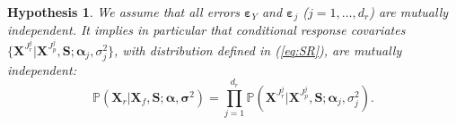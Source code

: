 \documentclass[12pt,a4paper]{report}
\newtheorem{hyp}{Hypothesis}
\begin{document}
\begin{hyp}\label{H3}
We assume that all errors $\boldsymbol{\varepsilon}_Y$ and $\boldsymbol{\varepsilon}_j$ ($j=1,\ldots,d_r$) are {\it mutually independent}. It implies in particular that conditional response covariates $\{\boldsymbol{X}^{J_{r}^j}|\boldsymbol{X}^{J_{p}^j},\boldsymbol{S};\boldsymbol{\alpha}_j,\sigma^2_j\}$, with distribution defined in (\ref{eq:SR}), are {\it mutually independent}:
\begin{equation}\label{eq:H3}
\mathbb{P}(\boldsymbol{X}_r | \boldsymbol{X}_f,\boldsymbol{S};\boldsymbol{\alpha},\boldsymbol{\sigma}^2) = \prod_{j=1}^{d_r} \mathbb{P}(\boldsymbol{X}^{J_{r}^j}|\boldsymbol{X}^{J_{p}^j},\boldsymbol{S};\boldsymbol{\alpha}_j,\sigma^2_j). 
\end{equation}
\end{hyp}

\vspace{3mm}
\end{document}
